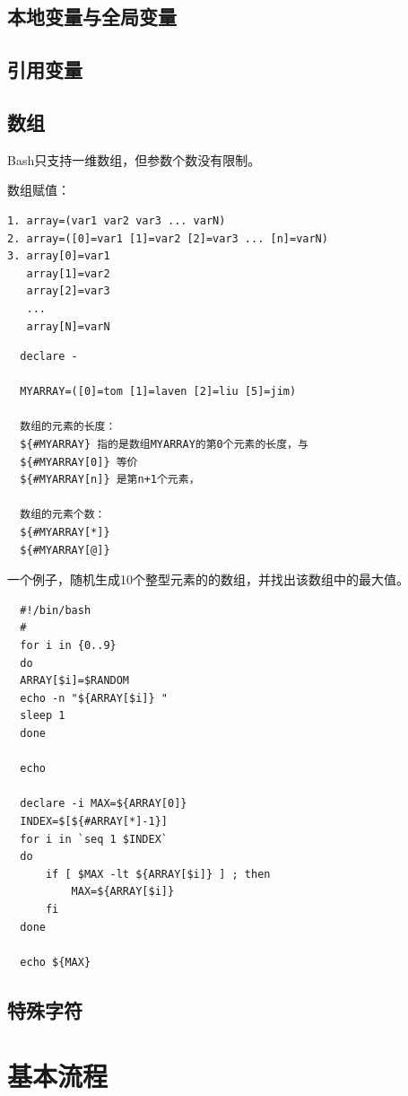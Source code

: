 \subsection{本地变量与全局变量}

\subsection{引用变量}

\subsection{数组}

Bash只支持一维数组，但参数个数没有限制。

数组赋值：

\begin{verbatim}
1. array=(var1 var2 var3 ... varN)
2. array=([0]=var1 [1]=var2 [2]=var3 ... [n]=varN)
3. array[0]=var1
   array[1]=var2
   array[2]=var3
   ...
   array[N]=varN
\end{verbatim}

\begin{verbatim}
  declare -

  MYARRAY=([0]=tom [1]=laven [2]=liu [5]=jim)
  
  数组的元素的长度：
  ${#MYARRAY} 指的是数组MYARRAY的第0个元素的长度，与
  ${#MYARRAY[0]} 等价
  ${#MYARRAY[n]} 是第n+1个元素，

  数组的元素个数：
  ${#MYARRAY[*]}
  ${#MYARRAY[@]}
\end{verbatim}
  一个例子，随机生成10个整型元素的的数组，并找出该数组中的最大值。
  \begin{lstlisting}
  #!/bin/bash
  #
  for i in {0..9}
  do
  ARRAY[$i]=$RANDOM
  echo -n "${ARRAY[$i]} "
  sleep 1
  done

  echo

  declare -i MAX=${ARRAY[0]}
  INDEX=$[${#ARRAY[*]-1}]
  for i in `seq 1 $INDEX`
  do
      if [ $MAX -lt ${ARRAY[$i]} ] ; then
          MAX=${ARRAY[$i]}
      fi
  done

  echo ${MAX}
  \end{lstlisting}

\subsection{特殊字符}

\section{基本流程}

